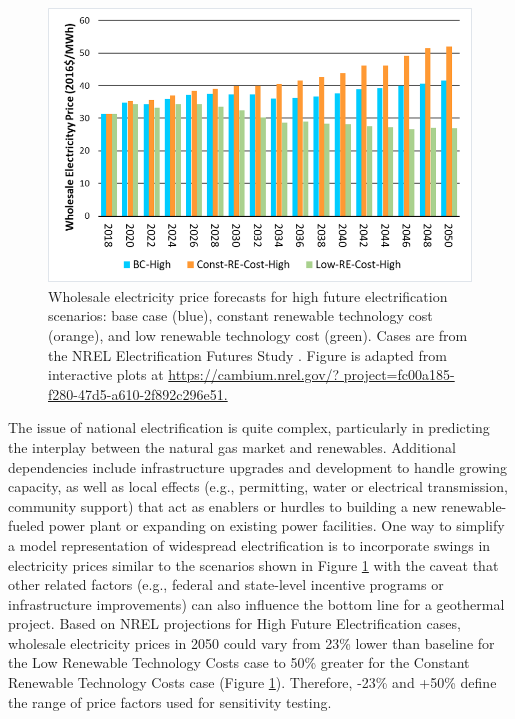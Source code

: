 \begin{figure}
\centering
\includegraphics[scale=0.65]{templates/images/Figure-EFS_SIPA_Results.png}
\singlespacing
\caption[Electrification price impact]{Wholesale electricity price forecasts for high future electrification scenarios: base case (blue), constant renewable technology cost (orange), and low renewable technology cost (green). Cases are from the NREL Electrification Futures Study \protect\citep{murphy_electrification_2021}. Figure is adapted from interactive plots at \url{https://cambium.nrel.gov/? project=fc00a185-f280-47d5-a610-2f892c296e51.}}
\label{fig:EFS_electricification}
\end{figure}
The issue of national electrification is quite complex, particularly in predicting the interplay between the natural gas market and renewables. Additional dependencies include infrastructure upgrades and development to handle growing capacity, as well as local effects (e.g., permitting, water or electrical transmission, community support) that act as enablers or hurdles to building a new renewable-fueled power plant or expanding on existing power facilities. One way to simplify a model representation of widespread electrification is to incorporate swings in electricity prices similar to the scenarios shown in Figure \ref{fig:EFS_electricification} with the caveat that other related factors (e.g., federal and state-level incentive programs or infrastructure improvements) can also influence the bottom line for a geothermal project. Based on NREL projections for High Future Electrification cases, wholesale electricity prices in 2050 could vary from 23\% lower than baseline for the Low Renewable Technology Costs case to 50\% greater for the Constant Renewable Technology Costs case (Figure \ref{fig:EFS_electricification}). Therefore, -23\% and +50\% define the range of price factors used for sensitivity testing.
\\
\\

